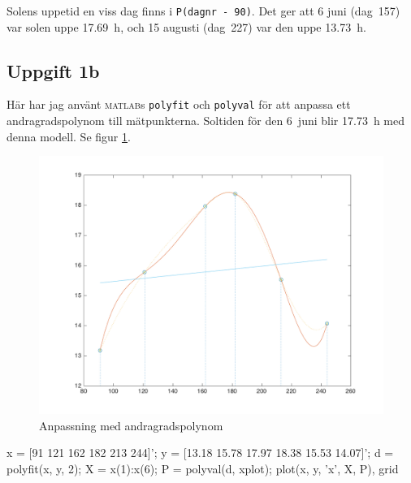 \documentclass[10,]{article}
\newenvironment{Shaded}{}{}
\newcommand{\FloatTok}[1]{\textcolor[rgb]{0.25,0.63,0.44}{{#1}}}
\newcommand{\StringTok}[1]{\textcolor[rgb]{0.25,0.44,0.63}{{#1}}}
\newcommand{\NormalTok}[1]{{#1}}
\begin{document}
Solens uppetid en viss dag finns i \texttt{P(dagnr\ -\ 90)}. Det ger att
6 juni (dag~157) var solen uppe 17.69~h, och 15 augusti (dag~227) var
den uppe 13.73~h.

\subsection{Uppgift 1b}\label{uppgift-1b}

Här har jag använt \textsc{matlab}s \texttt{polyfit} och
\texttt{polyval} för att anpassa ett andragradspolynom till
mätpunkterna. Soltiden för den 6~juni blir 17.73~h med denna modell. Se
figur \ref{fig:fig1b}.

\begin{figure}[htbp]
\centering
\includegraphics{fig1b.png}
\caption{Anpassning med andragradspolynom\label{fig:fig1b}}
\end{figure}

\begin{Shaded}
\begin{Highlighting}[]
\NormalTok{x = [}\FloatTok{91} \FloatTok{121} \FloatTok{162} \FloatTok{182} \FloatTok{213} \FloatTok{244}\NormalTok{]';}
\NormalTok{y = [}\FloatTok{13.18} \FloatTok{15.78} \FloatTok{17.97} \FloatTok{18.38} \FloatTok{15.53} \FloatTok{14.07}\NormalTok{]';}
\NormalTok{d = polyfit(x, y, }\FloatTok{2}\NormalTok{);}
\NormalTok{X = x(}\FloatTok{1}\NormalTok{):x(}\FloatTok{6}\NormalTok{);}
\NormalTok{P = polyval(d, xplot);}
\NormalTok{plot(x, y, }\StringTok{'x'}\NormalTok{, X, P), grid}
\end{Highlighting}
\end{Shaded}
\end{document}
